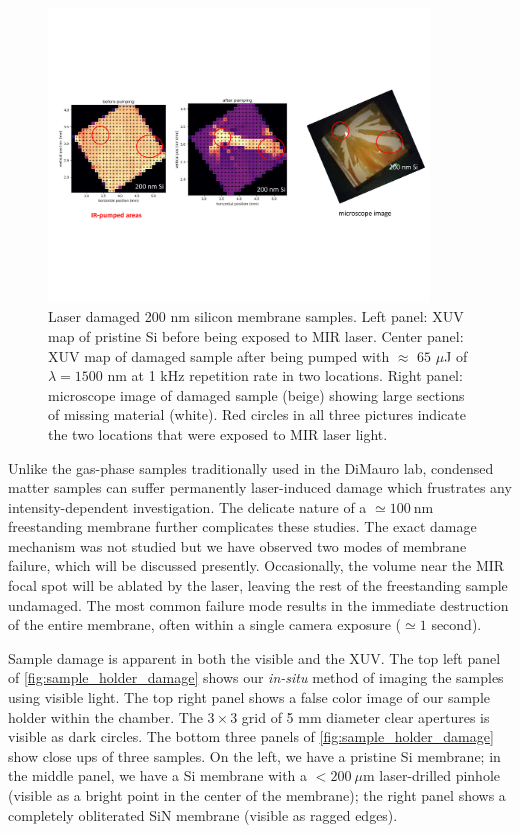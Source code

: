 \begin{figure}
	\centering
	\includegraphics[width=0.9\textwidth]{figures/chap4/Si_damage.pdf}
	\caption{Laser damaged 200 nm silicon membrane samples. Left panel: XUV map of pristine Si before being exposed to MIR laser. Center panel: XUV map of damaged sample after being pumped with $\approx \text{ 65 }\mu$J of $\lambda = 1500 \text{ nm}$ at 1 kHz repetition rate in two locations. Right panel: microscope image of damaged sample (beige) showing large sections of missing material (white). Red circles in all three pictures indicate the two locations that were exposed to MIR laser light.}
	\label{fig:Si_damage}
\end{figure}

Unlike the gas-phase samples traditionally used in the DiMauro lab, condensed matter samples can suffer permanently laser-induced damage which frustrates any intensity-dependent investigation. The delicate nature of a $\simeq 100 \ \textrm{nm}$ freestanding membrane further complicates these studies. The exact damage mechanism was not studied but we have observed two modes of membrane failure, which will be discussed presently. Occasionally, the volume near the MIR focal spot will be ablated by the laser, leaving the rest of the freestanding sample undamaged. The most common failure mode results in the immediate destruction of the entire membrane, often within a single camera exposure ($\simeq 1$ second).

Sample damage is apparent in both the visible and the XUV. The top left panel of \cref{fig:sample_holder_damage} shows our \textit{in-situ} method of imaging the samples using visible light. The top right panel shows a false color image of our sample holder within the chamber. The $3 \times 3$ grid of 5 mm diameter clear apertures is visible as dark circles. The bottom three panels of \cref{fig:sample_holder_damage} show close ups of three samples. On the left, we have a pristine Si membrane; in the middle panel, we have a Si membrane with a $<200 \ \mu \textrm{m}$ laser-drilled pinhole (visible as a bright point in the center of the membrane); the right panel shows a completely obliterated SiN membrane (visible as ragged edges).

